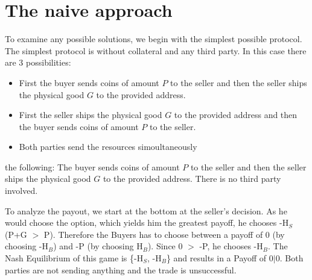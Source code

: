 \documentclass{cacthesis}
\begin{document}
\section{The naive approach}
To examine any possible solutions, we begin with the simplest possible protocol.\newline
The simplest protocol is without collateral and any third party. In this case there are 3 possibilities:
\begin{itemize}
	\item First the buyer sends coins of amount $P$ to the seller and then the seller ships the physical good $G$ to the provided address. 
	\item First the seller ships the physical good $G$ to the provided address and then the buyer sends coins of amount $P$ to the seller. 
	\item Both parties send the resources simoultaneously
\end{itemize}
 the following: The buyer sends coins of amount $P$ to the seller and then the seller ships the physical good $G$ to the provided address. There is no third party involved. 

\newline
To analyze the payout, we start at the bottom at the seller's decision. As he would choose the option, which yields him the greatest payoff, he chooses -H$_S$ (P+G $>$ P).\newline
Therefore the Buyers has to choose between a payoff of 0 (by choosing -H$_B$) and -P (by choosing H$_B$). Since 0 $>$ -P, he chooses -H$_B$.\newline
The Nash Equilibrium of this game is \{-H$_S$, -H$_B$\} and results in a Payoff of $0|0$. Both parties are not sending anything and the trade is unsuccessful.
\end{document}
